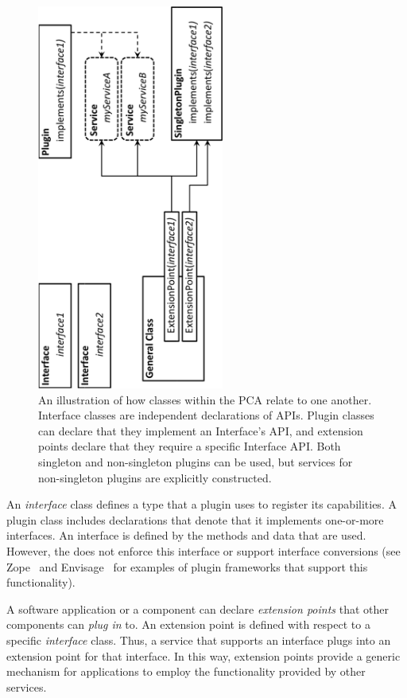 \begin{figure}[htb]
  \center
  \includegraphics[height=5in,angle=-90]{figures/definitions.pdf}
  \caption{An illustration of how classes within the PCA relate to one another.  Interface classes are independent declarations of APIs.  Plugin classes can declare that they implement an Interface's API, and extension points declare that they require a specific
Interface API.  Both singleton and non-singleton plugins can be used, but services for non-singleton plugins are explicitly constructed.}
  \label{fig:defs}
\end{figure}

An \textit{interface} class defines a type that a plugin uses to register
its capabilities.  A plugin class includes declarations that denote that
it implements one-or-more interfaces. An interface is defined by the
methods and data that are used.  However, the \pcasp does not enforce
this interface or support interface conversions (see Zope~\cite{Zope}
and Envisage~\cite{Envisage} for examples of plugin frameworks that
support this functionality).

A software application or a component can declare \textit{extension
  points} that other
components can \textit{plug in} to. An extension point is defined with
respect to a specific \textit{interface} class.  Thus, a service that
supports an interface plugs into an extension point for that interface.
In this way, extension points provide a generic mechanism for applications
to employ the functionality provided by other services.

